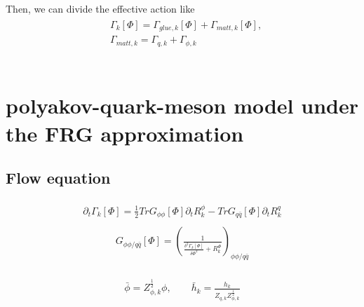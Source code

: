 \documentclass[%
reprint,
superscriptaddress,
showpacs,preprintnumbers,
 amsmath,amssymb,
 aps,
prd,
]{revtex4-1}
\begin{document}
Then, we can divide the effective action like
\begin{align}
\begin{split}
&\Gamma_{k}[\Phi]=\Gamma_{glue,k}[\Phi]+\Gamma_{matt,k}[\Phi],\\
&\Gamma_{matt,k}=\Gamma_{q,k}+
\Gamma_{\phi,k}
\label{}
\end{split}
\end{align}\\



\section{polyakov-quark-meson model under the FRG approximation}







\subsection{Flow equation}

\begin{align}\label{fqm}
\begin{split}
\partial_t\Gamma_k[\Phi]=\frac{1}{2}TrG_{\phi\phi}[\Phi]\partial_tR^{\phi}_{k}-TrG_{q\bar{q}}[\Phi]\partial_tR^{q}_{k}
\end{split}
\end{align}
\begin{align}\label{cqm}
\begin{split}
G_{\phi\phi/q\bar{q}}[\Phi]=\left( \frac{1}{\frac{\delta^2\Gamma_k[\Phi]}{\delta\Phi^2}+R^{\Phi}_{k}} \right)_{\phi\phi/
q\bar{q}}
\end{split}
\end{align}

\begin{align}\label{}
\begin{split}
\bar{\phi}=Z^{\frac{1}{2}}_{\phi,k}\phi ,\qquad \bar{h}_k=\frac{h_k}{Z_{q,k}Z^{\frac{1}{2}}_{\phi,k}}
\end{split}
\end{align}



\end{document}
